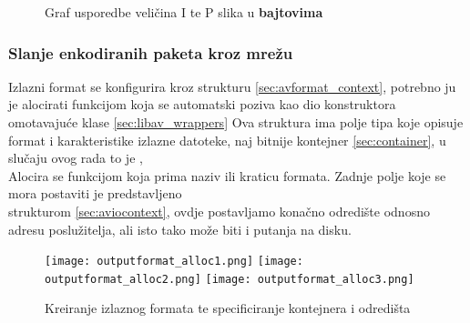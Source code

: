 \begin{figure}[h]
  \centering
  \caption[Graf usporedbe veličina I i P slika]{Graf usporedbe veličina I te P slika u \textbf{bajtovima}} \label{pic:pict_type}
\end{figure}
\clearpage

\clearpage
\subsubsection{Slanje enkodiranih paketa kroz mrežu}
Izlazni format se konfigurira kroz strukturu  \ref{sec:avformat_context}, potrebno ju je
alocirati funkcijom  koja se automatski poziva kao dio konstruktora omotavajuće
klase \ref{sec:libav_wrappers}
\paraBreak
Ova struktura ima polje tipa  koje opisuje format i karakteristike izlazne datoteke,
naj bitnije kontejner \ref{sec:container},
u slučaju ovog rada to je ,
\\
Alocira se funkcijom  koja prima naziv ili kraticu formata.
\paraBreak
Zadnje polje koje se mora postaviti je  predstavljeno \\
strukturom  \ref{sec:aviocontext}, ovdje postavljamo konačno odredište odnosno adresu poslužitelja, ali
isto tako može biti i putanja na disku.
\begin{figure}[h]
  \texttt{[image: outputformat\_alloc1.png]}
  \texttt{[image: outputformat\_alloc2.png]}
  \texttt{[image: outputformat\_alloc3.png]}
  \caption[Kreiranje izlaznog formata]{Kreiranje izlaznog formata te specificiranje kontejnera i odredišta}
\end{figure}

